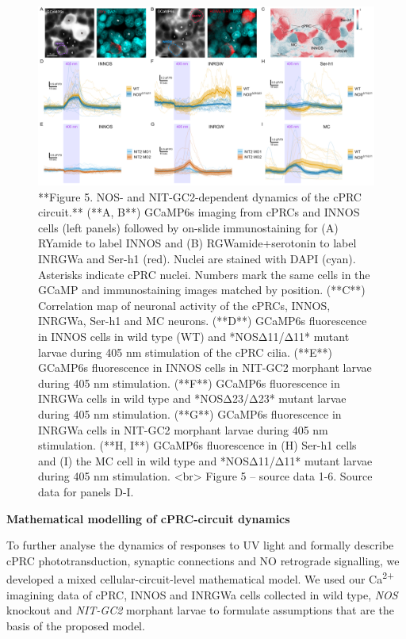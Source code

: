 \documentclass[
  10pt,
  onecolumn]{article}
\begin{document}
\begin{figure}
\includegraphics[width=52.08in]{figures/Fig5} \caption{**Figure 5. NOS- and NIT-GC2-dependent dynamics of the cPRC circuit.** (**A, B**) GCaMP6s imaging from cPRCs and INNOS cells (left panels) followed by on-slide immunostaining for (A) RYamide to label INNOS and (B) RGWamide+serotonin to label INRGWa and Ser-h1 (red). Nuclei are stained with DAPI (cyan). Asterisks indicate cPRC nuclei. Numbers mark the same cells in the GCaMP and immunostaining images matched by position. (**C**) Correlation map of neuronal activity of the cPRCs, INNOS, INRGWa, Ser-h1 and MC neurons. (**D**) GCaMP6s fluorescence in INNOS cells in wild type (WT) and *NOSΔ11/Δ11* mutant larvae during 405 nm stimulation of the cPRC cilia. (**E**) GCaMP6s fluorescence in INNOS cells in NIT-GC2 morphant larvae during 405 nm stimulation. (**F**) GCaMP6s fluorescence in INRGWa cells in wild type and *NOSΔ23/Δ23* mutant larvae during 405 nm stimulation. (**G**) GCaMP6s fluorescence in INRGWa cells in NIT-GC2 morphant larvae during 405 nm stimulation. (**H, I**) GCaMP6s fluorescence in (H) Ser-h1 cells and (I) the MC cell in wild type and *NOSΔ11/Δ11* mutant larvae during 405 nm stimulation. <br> Figure 5 -- source data 1-6. Source data for panels D-I.}\label{fig:unnamed-chunk-5}
\end{figure}

\textbf{Mathematical modelling of cPRC-circuit dynamics}

To further analyse the dynamics of responses to UV light and formally
describe cPRC phototransduction, synaptic connections and NO retrograde
signalling, we developed a mixed cellular-circuit-level mathematical
model. We used our Ca\textsuperscript{2+} imagining data of cPRC, INNOS
and INRGWa cells collected in wild type, \emph{NOS} knockout and
\emph{NIT-GC2} morphant larvae to formulate assumptions that are the
basis of the proposed model.
\end{document}
